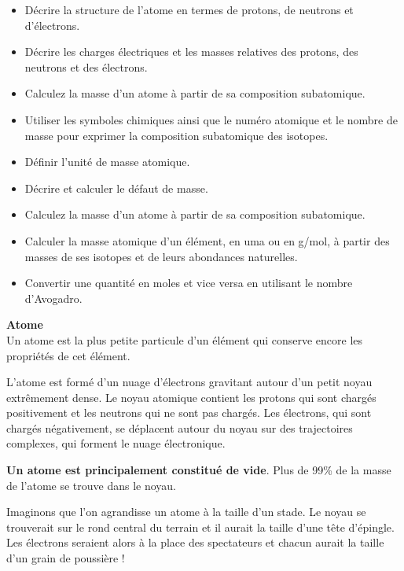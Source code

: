 \documentclass[
  11pt,
  a4paper,
  openany]{book}
\providecommand{\tightlist}{%
  \setlength{\itemsep}{0pt}\setlength{\parskip}{0pt}}
\begin{document}
\begin{objectives}

\begin{itemize}
\tightlist
\item
  Décrire la structure de l'atome en termes de protons, de neutrons et d'électrons.
\item
  Décrire les charges électriques et les masses relatives des protons, des neutrons et des électrons.
\item
  Calculez la masse d'un atome à partir de sa composition subatomique.
\item
  Utiliser les symboles chimiques ainsi que le numéro atomique et le nombre de masse pour exprimer la composition subatomique des isotopes.
\item
  Définir l'unité de masse atomique.
\item
  Décrire et calculer le défaut de masse.
\item
  Calculez la masse d'un atome à partir de sa composition subatomique.
\item
  Calculer la masse atomique d'un élément, en uma ou en g/mol, à partir des masses de ses isotopes et de leurs abondances naturelles.
\item
  Convertir une quantité en moles et vice versa en utilisant le nombre d'Avogadro.
\end{itemize}

\end{objectives}

\begin{tcolorbox}
\textbf{Atome}\\
Un atome est la plus petite particule d'un élément qui conserve encore les propriétés de cet élément.

\end{tcolorbox}

L'atome est formé d'un nuage d'électrons gravitant autour d'un petit noyau extrêmement dense. Le noyau atomique contient les protons qui sont chargés positivement et les neutrons qui ne sont pas chargés. Les électrons, qui sont chargés négativement, se déplacent autour du noyau sur des trajectoires complexes, qui forment le nuage électronique.

\textbf{Un atome est principalement constitué de vide}. Plus de 99\% de la masse de l'atome se trouve dans le noyau.

Imaginons que l'on agrandisse un atome à la taille d'un stade. Le noyau se trouverait sur le rond central du terrain et il aurait la taille d'une tête d'épingle. Les électrons seraient alors à la place des spectateurs et chacun aurait la taille d'un grain de poussière !
\end{document}
